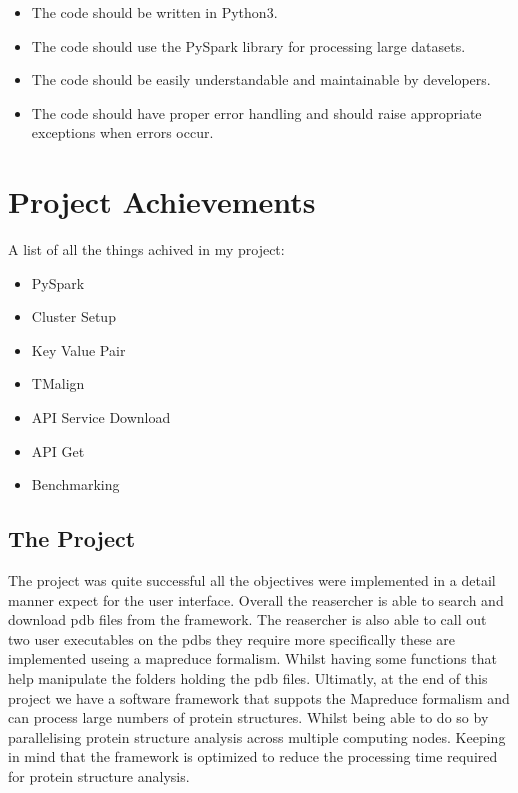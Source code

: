 \documentclass[]{final_report}
\begin{document}
\begin{itemize}
    \item The code should be written in Python3.
    \item The code should use the PySpark library for processing large datasets.
    \item The code should be easily understandable and maintainable by developers.
    \item The code should have proper error handling and should raise appropriate exceptions when errors occur.
\end{itemize}




\section{Project Achievements}
A list of all the things achived in my project:

\begin{itemize}
    \item PySpark
    \item Cluster Setup
    \item Key Value Pair
    \item TMalign
    \item API Service Download
    \item API Get
    \item Benchmarking
\end{itemize}

\subsection{The Project}

The project was quite successful all the objectives were implemented in a detail manner expect for the user interface. Overall the reasercher is able to search and download pdb files from the framework. The reasercher is also able to call out two user executables on the pdbs they require more specifically these are implemented useing a mapreduce formalism. Whilst having some functions that help manipulate the folders holding the pdb files. Ultimatly, at the end of this project we have a software framework that suppots the Mapreduce formalism and can process large numbers of protein structures. Whilst being able to do so by parallelising protein structure analysis across multiple computing nodes. Keeping in mind that the framework is optimized to reduce the processing time required for protein structure analysis.
\end{document}
